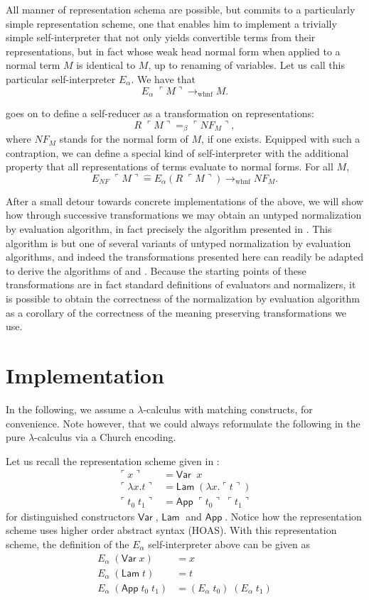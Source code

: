\documentclass[a4paper]{amsart}
\newcommand{\quot}[1]{\ulcorner#1\urcorner}
\newcommand{\Var}{\mathsf{Var}\;}
\newcommand{\Lam}{\mathsf{Lam}\;}
\newcommand{\App}{\mathsf{App}\;}
\begin{document}
All manner of representation schema are possible, but
\citeauthor{mogensen:selfint} commits to a particularly simple representation
scheme, one that enables him to implement a trivially simple self-interpreter
that not only yields convertible terms from their representations, but in fact
whose weak head normal form when applied to a normal term $M$ is identical to
$M$, up to renaming of variables. Let us call this particular self-interpreter
$E_\alpha$. We have that
\[
E_\alpha\;\quot M \longrightarrow_{\mathrm{whnf}} M.
\]

\citeauthor{mogensen:selfint} goes on to define a self-reducer as a
transformation on representations:
\[
R\;\quot M =_\beta \quot{NF_M},
\]
where $NF_M$ stands for the normal form of $M$, if one exists. Equipped with
such a contraption, we can define a special kind of self-interpreter with the
additional property that all representations of terms evaluate to normal
forms. For all $M$,
\[
E_{NF}\;\quot M \hat= E_\alpha(R\;\quot M) \longrightarrow_{\mathrm{whnf}} NF_M.
\]

After a small detour towards concrete implementations of the above, we will
show how through successive transformations we may obtain an untyped
normalization by evaluation algorithm, in fact precisely the algorithm
presented in \citep{boespflug:efficientnbe}. This algorithm is but one of
several variants of untyped normalization by evaluation algorithms, and indeed
the transformations presented here can readily be adapted to derive the
algorithms of \citet{aehlig:cin} and \citet{filinski:dau}. Because the
starting points of these transformations are in fact standard definitions of
evaluators and normalizers, it is possible to obtain the correctness of the
normalization by evaluation algorithm as a corollary of the correctness of the
meaning preserving transformations we use.

\section{Implementation}

In the following, we assume a $\lambda$-calculus with matching constructs, for
convenience. Note however, that we could always reformulate the following in
the pure $\lambda$-calculus via a Church encoding.

Let us recall the representation scheme given in \citep{mogensen:selfint}:
\begin{align*}
  \quot{x} &= \Var\;x \\
  \quot{\lambda x.t} &= \Lam (\lambda x. \quot t) \\
  \quot{t_0\;t_1} &= \App \quot{t_0}\;\quot{t_1}
\end{align*}
for distinguished constructors $\Var$, $\Lam$ and $\App$. Notice how the
representation scheme uses higher order abstract syntax (HOAS). With this
representation scheme, the definition of the $E_\alpha$ self-interpreter above
can be given as
\begin{align*}
  E_\alpha\;(\Var x) &= x \\
  E_\alpha\;(\Lam t) &= t \\
  E_\alpha\;(\App t_0\;t_1) &= (E_\alpha\;t_0)\;(E_\alpha\;t_1)
\end{align*}
\end{document}

